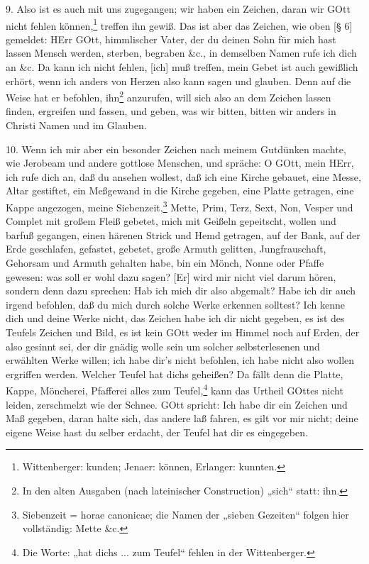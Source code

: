 9. Also ist es auch mit uns zugegangen; wir haben ein Zeichen, daran wir GOtt nicht fehlen können,\footnote{Wittenberger: kunden; Jenaer: können, Erlanger: kunnten.} treffen ihn gewiß. Das ist aber das Zeichen, wie oben [§ 6] gemeldet: HErr GOtt, himmlischer Vater, der du deinen Sohn für mich hast lassen Mensch werden, sterben, begraben \&c., in demselben Namen rufe ich dich an \&c. Da kann ich nicht fehlen, [ich] muß treffen, mein Gebet ist auch gewißlich erhört, wenn ich anders von Herzen also kann sagen und glauben. Denn auf die Weise hat er befohlen, ihn\footnote{In den alten Ausgaben (nach lateinischer Construction) „sich“ statt: ihn.} anzurufen, will sich also an dem Zeichen lassen finden, ergreifen und fassen, und geben, was wir bitten, bitten wir anders in Christi Namen und im Glauben.

10. Wenn ich mir aber ein besonder Zeichen nach meinem Gutdünken machte, wie Jerobeam und andere gottlose Menschen, und spräche: O GOtt, mein HErr, ich rufe dich an, daß du ansehen wollest, daß ich eine Kirche gebauet, eine Messe, Altar gestiftet, ein Meßgewand in die Kirche gegeben, eine Platte getragen, eine Kappe angezogen, meine Siebenzeit,\footnote{Siebenzeit = horae canonicae; die Namen der „sieben Gezeiten“ folgen hier vollständig: Mette \&c.} Mette, Prim, Terz, Sext, Non, Vesper und Complet mit großem Fleiß gebetet, mich mit Geißeln gepeitscht, wollen und barfuß gegangen, einen härenen Strick und Hemd getragen, auf der Bank, auf der Erde geschlafen, gefastet, gebetet, große Armuth gelitten, Jungfrauschaft, Gehorsam und Armuth gehalten habe, bin ein Mönch, Nonne oder Pfaffe gewesen: was soll er wohl dazu sagen? [Er] wird mir nicht viel darum hören, sondern denn dazu sprechen: Hab ich mich dir also abgemalt? Habe ich dir auch irgend befohlen, daß du mich durch solche Werke erkennen solltest? Ich kenne dich und deine Werke nicht, das Zeichen habe ich dir nicht gegeben, es ist des Teufels Zeichen und Bild, es ist kein GOtt weder im Himmel noch auf Erden, der also gesinnt sei, der dir gnädig wolle sein um solcher selbsterlesenen und erwählten Werke willen; ich habe dir’s nicht befohlen, ich habe nicht also wollen ergriffen werden. Welcher Teufel hat dichs geheißen? Da fällt denn die Platte, Kappe, Möncherei, Pfafferei alles zum Teufel,\footnote{Die Worte: „hat dichs ... zum Teufel“ fehlen in der Wittenberger.} kann das Urtheil GOttes nicht leiden, zerschmelzt wie der Schnee. GOtt spricht: Ich habe dir ein Zeichen und Maß gegeben, daran halte sich, das andere laß fahren, es gilt vor mir nicht; deine eigene Weise hast du selber erdacht, der Teufel hat dir es eingegeben.

